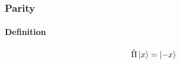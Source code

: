\documentclass[letterpaper,10pt,english]{sphinxmanual}
\newcommand{\ket}[1]{\left| #1\right\rangle}
\begin{document}
\subsubsection{Parity}
\label{QuantumMechanics:id2}

\paragraph{Definition}
\label{QuantumMechanics:definition}\begin{gather}
\begin{split}\hat \Pi \ket{x}= \ket{-x}\end{split}\notag\\\begin{split}\end{split}\notag
\end{gather}
\end{document}
